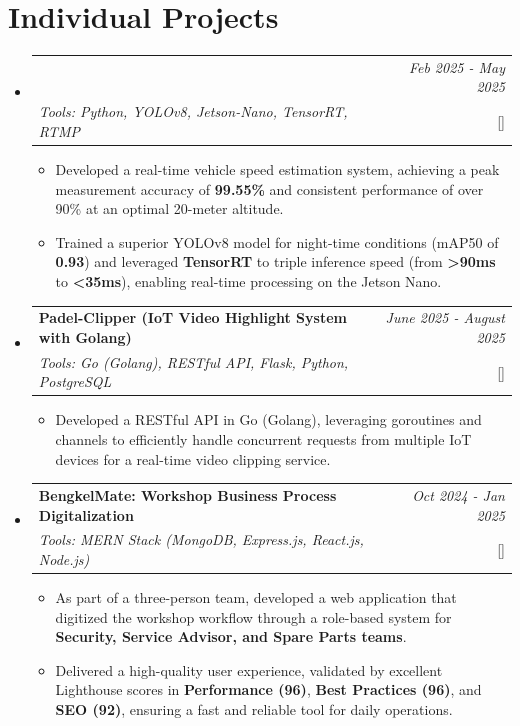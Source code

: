 \documentclass[a4paper,11pt]{article}
\makeatletter
\newcommand{\resumeItemMain}[1]{
  \item #1
}
\newcommand{\resumeProject}[4]{
\vspace{0.5mm}\item
    \begin{tabular*}{0.98\textwidth}[t]{l@{\extracolsep{\fill}}r}
        \textbf{#1} & \textit{\footnotesize{#3}} \\
        \footnotesize{\textit{#2}} & \footnotesize{#4}
    \end{tabular*}
    \vspace{-2.4mm}
}
\newcommand{\resumeSubHeadingListStart}{\begin{itemize}[leftmargin=*,labelsep=0.1mm]}
\newcommand{\resumeItemListStart}{\begin{itemize}[leftmargin=*,labelsep=1mm,itemsep=0.5mm]}
\newcommand{\resumeSubHeadingListEnd}{\end{itemize}\vspace{2mm}}
\newcommand{\resumeItemListEnd}{\end{itemize}\vspace{-2mm}}
\makeatother
\begin{document}
\section{\textbf{Individual Projects}}
\vspace{-0.4mm}
\resumeSubHeadingListStart

\resumeProject
    {\parbox{0.8\linewidth}{Vehicle Speed Estimation System Using Drone with Jetson Nano-based YOLOv8 Method}}
    {Tools: Python, YOLOv8, Jetson-Nano, TensorRT, RTMP}
    {Feb 2025 - May 2025}
    {{}[\href{https://github.com/still-breath/speed-detection_drone_jetson-nano}
    {\textcolor{darkblue}{\faGithub}}]}
\resumeItemListStart
    \resumeItemMain{Developed a real-time vehicle speed estimation system, achieving a peak measurement accuracy of \textbf{99.55\%} and consistent performance of over 90\% at an optimal 20-meter altitude.}
    \resumeItemMain{Trained a superior YOLOv8 model for night-time conditions (mAP50 of \textbf{0.93}) and leveraged \textbf{TensorRT} to triple inference speed (from \textbf{>90ms} to \textbf{<35ms}), enabling real-time processing on the Jetson Nano.}
\resumeItemListEnd

\resumeProject
    {Padel-Clipper (IoT Video Highlight System with Golang)}
    {Tools: Go (Golang), RESTful API, Flask, Python, PostgreSQL}
    {June 2025 - August 2025}
    {{}[\href{https://github.com/still-breath/clipper-dashboard-go}
    {\textcolor{darkblue}{\faGithub}}]}
\resumeItemListStart
    \resumeItemMain{Developed a RESTful API in Go (Golang), leveraging goroutines and channels to efficiently handle concurrent requests from multiple IoT devices for a real-time video clipping service.}
\resumeItemListEnd

\resumeProject
    {BengkelMate: Workshop Business Process Digitalization}
    {Tools: MERN Stack (MongoDB, Express.js, React.js, Node.js)}
    {Oct 2024 - Jan 2025}
    {{}[\href{https://github.com/still-breath/webapp-astrawaru}
    {\textcolor{darkblue}{\faGithub}}]}
\resumeItemListStart
    \resumeItemMain{As part of a three-person team, developed a web application that digitized the workshop workflow through a role-based system for \textbf{Security, Service Advisor, and Spare Parts teams}.}
    \resumeItemMain{Delivered a high-quality user experience, validated by excellent Lighthouse scores in \textbf{Performance (96)}, \textbf{Best Practices (96)}, and \textbf{SEO (92)}, ensuring a fast and reliable tool for daily operations.}
\resumeItemListEnd
\resumeSubHeadingListEnd
\vspace{-8mm}
\end{document}
